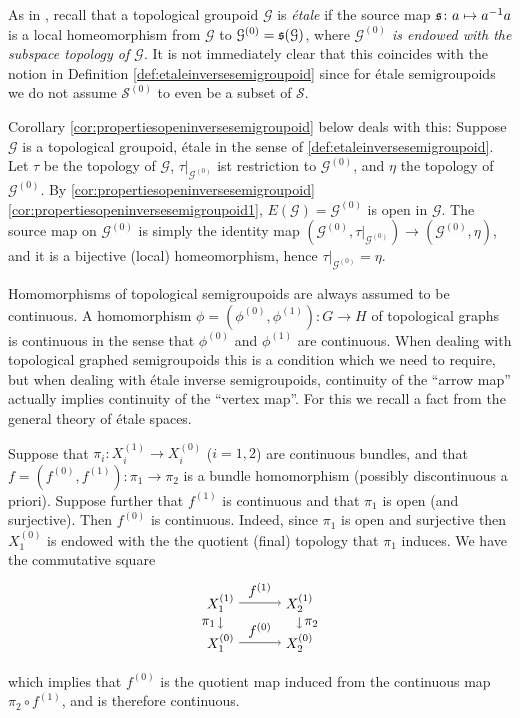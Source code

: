 \begin{remark}
As in \cite{MR2304314}, recall that a topological groupoid $\mathcal{G}$ is \emph{étale} if the source map $\operatorname{\mathfrak{s}}\colon a\mapsto a^{-1}a$ is a local homeomorphism from $\mathcal{G}$ to $\mathcal{G}^{(0)}=\operatorname{\mathfrak{s}}(\mathcal{G})$, where \emph{$\mathcal{G}^{(0)}$ is endowed with the subspace topology of $\mathcal{G}$}. It is not immediately clear that this coincides with the notion in Definition \ref{def:etaleinversesemigroupoid} since for étale semigroupoids we do not assume $\mathcal{S}^{(0)}$ to even be a subset of $\mathcal{S}$.

Corollary \ref{cor:propertiesopeninversesemigroupoid} below deals with this: Suppose $\mathcal{G}$ is a topological groupoid, étale in the sense of \ref{def:etaleinversesemigroupoid}. Let $\tau$ be the topology of $\mathcal{G}$, $\tau|_{\mathcal{G}^{(0)}}$ ist restriction to $\mathcal{G}^{(0)}$, and $\eta$ the topology of $\mathcal{G}^{(0)}$. By \ref{cor:propertiesopeninversesemigroupoid}\ref{cor:propertiesopeninversesemigroupoid1}, $E(\mathcal{G})=\mathcal{G}^{(0)}$ is open in $\mathcal{G}$. The source map on $\mathcal{G}^{(0)}$ is simply the identity map $(\mathcal{G}^{(0)},\tau|_{\mathcal{G}^{(0)}})\to(\mathcal{G}^{(0)},\eta)$, and it is a bijective (local) homeomorphism, hence $\tau|_{\mathcal{G}^{(0)}}=\eta$.
\end{remark}

Homomorphisms of topological semigroupoids are always assumed to be continuous. A homomorphism $\phi=(\phi^{(0)},\phi^{(1)})\colon G\to H$ of topological graphs is continuous in the sense that $\phi^{(0)}$ and $\phi^{(1)}$ are continuous. When dealing with topological graphed semigroupoids this is a condition which we need to require, but when dealing with étale inverse semigroupoids, continuity of the ``arrow map'' actually implies continuity of the ``vertex map''. For this we recall a fact from the general theory of étale spaces.

Suppose that $\pi_i\colon X_i^{(1)}\to X_i^{(0)}$ ($i=1,2$) are continuous bundles,  and that $f=(f^{(0)},f^{(1)})\colon\pi_1\to\pi_2$ is a bundle homomorphism (possibly discontinuous a priori). Suppose further that $f^{(1)}$ is continuous and that $\pi_1$ is open (and surjective). Then $f^{(0)}$ is continuous. Indeed, since $\pi_1$ is open and surjective then $X_1^{(0)}$ is endowed with the the quotient (final) topology that $\pi_1$ induces. We have the commutative square
\[\begin{tikzpicture}
\node (X11) at (0,0) {$X_1^{(1)}$};
\node (X10) at ([shift={+(0,-1)}]X11) {$X_1^{(0)}$};
\node (X21) at ([shift={+(2,0)}]X11) {$X_2^{(1)}$};
\node (X20) at ([shift={+(0,-1)}]X21) {$X_2^{(0)}$};
\draw[->] (X11)--(X21) node[midway,above] {$f^{(1)}$};
\draw[->] (X11)--(X10) node[midway,left] {$\pi_1$};
\draw[->] (X21)--(X20) node[midway,right] {$\pi_2$};
\draw[->] (X10)--(X20) node[midway,above] {$f^{(0)}$};
\end{tikzpicture}\]
which implies that $f^{(0)}$ is the quotient map induced from the continuous map $\pi_2\circ f^{(1)}$, and is therefore continuous.

